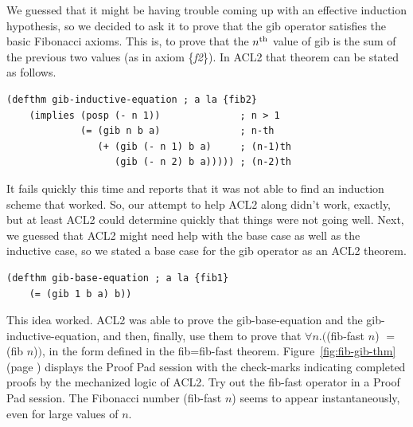 We guessed that it might be having trouble coming up with an effective
induction hypothesis, so we decided to ask it to prove that
the \textsf{gib} operator satisfies the basic Fibonacci axioms.
This is, to prove that the $n^\textnormal{th}$ value of \textsf{gib} is
the sum of the previous two values (as in axiom \{\emph{f2}\}).
In ACL2 that theorem can be stated as follows.
\begin{samepage}
\begin{center}
\begin{Verbatim}
(defthm gib-inductive-equation ; a la {fib2}
    (implies (posp (- n 1))              ; n > 1
             (= (gib n b a)              ; n-th
                (+ (gib (- n 1) b a)     ; (n-1)th
                   (gib (- n 2) b a))))) ; (n-2)th
\end{Verbatim}
\end{center}
\end{samepage}

It fails quickly this time and reports that it was not able
to find an induction scheme that worked.
So, our attempt to help ACL2 along didn't work, exactly,
but at least ACL2 could determine quickly that
things were not going well.
Next, we guessed that ACL2 might need help with the
base case as well as the inductive case, so we
stated a base case for the \textsf{gib} operator as an ACL2 theorem.

\begin{samepage}
\begin{center}
\begin{Verbatim}
(defthm gib-base-equation ; a la {fib1}
    (= (gib 1 b a) b))
\end{Verbatim}
\end{center}
\end{samepage}

This idea worked. ACL2 was able to prove the gib-base-equation
and the gib-inductive-equation, and then, finally,
use them to prove that $\forall n.($\textsf{(fib-fast $n$)} $=$ \textsf{(fib $n$)}$)$,
in the form defined in the \textsf{fib=fib-fast} theorem.
Figure~\ref{fig:fib-gib-thm} (page \pageref{fig:fib-gib-thm})
displays the Proof Pad session with the check-marks
indicating completed proofs by the mechanized logic of ACL2.
Try out the \textsf{fib-fast} operator in a Proof Pad session.
The Fibonacci number \textsf{(fib-fast $n$)} seems to appear
instantaneously, even for large values of $n$.

